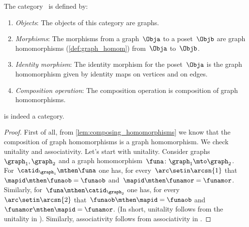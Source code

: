 \begin{ctdefinition}
    \label{def:Grph}
    The category~\iindex{\Grph} is defined by:
    \begin{enumerate}
        \item \emph{Objects}: The objects of this category are graphs.
        \item \emph{Morphisms}: The morphisms from a graph~$\Obja$ to a poset~$\Objb$ are graph homomorphisms (\cref{def:graph_homom}) from~$\Obja$ to~$\Objb$.
        \item \emph{Identity morphism}: The identity morphism for the poset~$\Obja$
              is the graph homomorphism given by identity maps on vertices and on edges.
        \item \emph{Composition operation}: The composition operation is composition of graph homomorphisms.
    \end{enumerate}
\end{ctdefinition}

\begin{lemma}
    \Grph is indeed a category.
\end{lemma}

\begin{proof}
    First of all, from \cref{lem:composing_homomorphisms} we know that the composition of graph homomorphisms is a graph homomorphism.
    We check unitality and associativity.
    Let's start with unitality.
    Consider graphs~$\graph_1,\graph_2$ and a graph homomorphism~$\funa\colon \graph_1\mto \graph_2$.
    For~$\catid_{\graph_1}\mthen \funa$ one has, for every~$\arc \setin \arcsn{1}$ that~$\mapid\mthen \funaob=\funaob$ and~$\mapid\mthen \funamor=\funamor$.
    Similarly, for~$\funa \mthen \catid_{\graph_2}$ one has, for every~$\arc \setin \arcsn{2}$ that~$\funaob\mthen \mapid=\funaob$ and~$\funamor \mthen \mapid=\funamor$.
    (In short, unitality follows from the unitality in \Set).
    Similarly, associativity follows from associativity in \Set.
\end{proof}